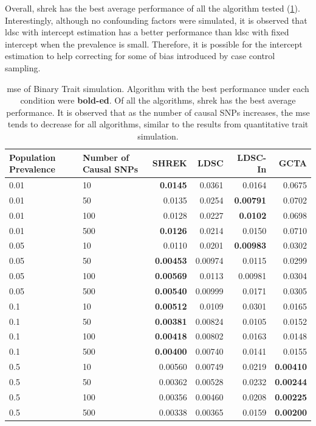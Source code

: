 \documentclass[12pt]{scrbook}
\begin{document}
Overall, \gls{shrek} has the best average performance of all the algorithm tested (\cref{tab:mseCC}).
Interestingly, although no confounding factors were simulated, it is observed that \gls{ldsc} with intercept estimation has a better performance than \gls{ldsc} with fixed intercept when the prevalence is small.
Therefore, it is possible for the intercept estimation to help correcting for some of bias introduced by case control sampling.

\begin{table}
	\centering
	\begin{tabular}{p{2cm}p{2.4cm}rrrr}
		\toprule
		Population Prevalence&	Number of Causal SNPs&	SHREK&	LDSC&	LDSC-In&	GCTA \\
		\midrule
		0.01&	10&	\textbf{0.0145}&	0.0361&	0.0164&	0.0675\\
		0.01&	50&	0.0135&	0.0254&	\textbf{0.00791}&	0.0702\\
		0.01&	100&	0.0128&	0.0227&	\textbf{0.0102}&	0.0698\\
		0.01&	500&	\textbf{0.0126}&	0.0214&	0.0150&	0.0710\\
		0.05&	10&	0.0110&	0.0201&	\textbf{0.00983}&	0.0302\\
		0.05&	50&	\textbf{0.00453}&	0.00974&	0.0115&	0.0299\\
		0.05&	100&	\textbf{0.00569}&	0.0113&	0.00981&	0.0304\\
		0.05&	500&	\textbf{0.00540}&	0.00999&	0.0171&	0.0305\\
		0.1&	10&	\textbf{0.00512}&	0.0109&	0.0301&	0.0165\\
		0.1&	50&	\textbf{0.00381}&	0.00824&	0.0105&	0.0152\\
		0.1&	100&	\textbf{0.00418}&	0.00802&	0.0163&	0.0148\\
		0.1&	500&	\textbf{0.00400}&	0.00740&	0.0141&	0.0155\\
		0.5&	10&	0.00560&	0.00749&	0.0219&	\textbf{0.00410}\\
		0.5&	50&	0.00362&	0.00528&	0.0232&	\textbf{0.00244}\\
		0.5&	100&	0.00356&	0.00460&	0.0208&	\textbf{0.00225}\\
		0.5&	500&	0.00338&	0.00365&	0.0159&	\textbf{0.00200}\\
		\bottomrule
	\end{tabular}
	\caption[MSE of Binary Trait Simulation]{
		\Gls{mse} of Binary Trait simulation.
		Algorithm with the best performance under each condition were \textbf{bold-ed}.
		Of all the algorithms, \gls{shrek} has the best average performance.
		It is observed that as the number of causal \glspl{SNP} increases, the \gls{mse} tends to decrease for all algorithms, similar to the results from quantitative trait simulation.
	}
	\label{tab:mseCC}
\end{table}
\end{document}
